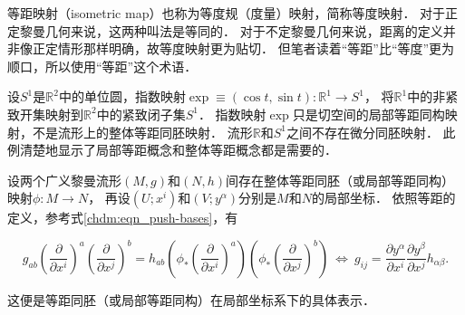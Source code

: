 \begin{remark}
	等距映射（isometric map）也称为等度规（度量）映射，简称{\heiti 等度映射}．
	对于正定黎曼几何来说，这两种叫法是等同的．
	对于不定黎曼几何来说，距离的定义并非像正定情形那样明确，故{\kaishu 等度映射}更为贴切．
	但笔者读着“等距”比“等度”更为顺口，所以使用“等距”这个术语．
\end{remark}


\begin{example}
    设$S^1$是$\mathbb{R}^2$中的单位圆，指数映射$\exp\equiv(\cos t, \sin t): \mathbb{R}^1 \to S^1$，
    将$\mathbb{R}^1$中的非紧致开集映射到$\mathbb{R}^2$中的紧致闭子集$S^1$．
    指数映射$\exp$只是切空间的局部等距同构映射，不是流形上的整体等距同胚映射．
    流形$\mathbb{R}$和$S^1$之间不存在微分同胚映射．
    此例清楚地显示了局部等距概念和整体等距概念都是需要的．
\end{example}

\begin{example}\label{chrg:exam_isometry-MNcoord}
    设两个广义黎曼流形$(M,g)$和$(N,h)$间存在整体等距同胚（或局部等距同构）映射$\phi:M\to N$，
    再设$(U;x^i)$和$(V;y^\alpha)$分别是$M$和$N$的局部坐标．
    依照等距的定义，参考式\eqref{chdm:eqn_push-bases}，有
    \begin{small} %
    \begin{equation}\label{chrg:eqn_isometry-MNcoord}
        g_{ab} \left(\frac{\partial }{\partial x^i}\right)^a
         \left(\frac{\partial }{\partial x^j}\right)^b = h_{ab}
        \left(\phi_{*} \left(\frac{\partial }{\partial x^i} \right)^a \right)
        \left(\phi_{*} \left(\frac{\partial }{\partial x^j} \right)^b \right)
        {\ \Leftrightarrow \  }  g_{ij}=\frac{\partial y^\alpha}{\partial x^i}
        \frac{\partial y^\beta}{\partial x^j} h_{\alpha\beta} .
    \end{equation}  %
    \end{small}
    这便是等距同胚（或局部等距同构）在局部坐标系下的具体表示．
\end{example}



